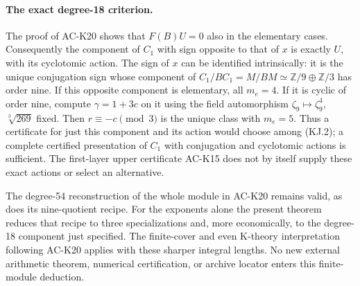 \paragraph{The exact degree-18 criterion.}
The proof of AC-K20 shows that $F(B)U=0$ also in the
elementary cases.  Consequently the component of $C_1$
with sign opposite to that of $x$ is exactly $U$, with
its cyclotomic action.  The sign of $x$ can be identified
intrinsically: it is the unique conjugation sign whose
component of
$C_1/BC_1=M/BM\simeq\mathbb Z/9\oplus\mathbb Z/3$
has order nine.  If this opposite component is elementary,
all $m_e=4$.  If it is cyclic of order nine, compute
$\gamma=1+3c$ on it using the field automorphism
$\zeta_9\mapsto\zeta_9^4$, $\sqrt[3]{269}$ fixed.
Then $r\equiv-c\pmod3$ is the unique class with $m_e=5$.
Thus a certificate for just this component and its action
would choose among (KJ.2); a complete certified
presentation of $C_1$ with conjugation and cyclotomic
actions is sufficient.  The first-layer upper certificate
AC-K15 does not by itself supply these exact actions or
select an alternative.

The degree-54 reconstruction of the whole module in AC-K20
remains valid, as does its nine-quotient recipe.  For the
exponents alone the present theorem reduces that recipe
to three specializations and, more economically, to the
degree-18 component just specified.  The finite-cover and
even K-theory interpretation following AC-K20 applies
with these sharper integral lengths.  No new external
arithmetic theorem, numerical certification, or archive
locator enters this finite-module deduction.
